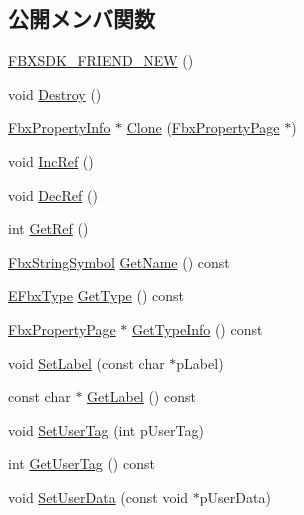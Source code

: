 \subsection*{公開メンバ関数}
\begin{DoxyCompactItemize}
\item 
\hyperlink{class_fbx_property_info_acec5442061367182cd674a7dd3267bc3}{F\+B\+X\+S\+D\+K\+\_\+\+F\+R\+I\+E\+N\+D\+\_\+\+N\+EW} ()
\item 
void \hyperlink{class_fbx_property_info_a8d507d411ed1695e545fbae824cf3843}{Destroy} ()
\item 
\hyperlink{class_fbx_property_info}{Fbx\+Property\+Info} $\ast$ \hyperlink{class_fbx_property_info_a2eacb232583e5bcb8f4abc5f6689b3b7}{Clone} (\hyperlink{class_fbx_property_page}{Fbx\+Property\+Page} $\ast$)
\item 
void \hyperlink{class_fbx_property_info_afa1a32d32b37e32e4b1ff4977b3ee9ab}{Inc\+Ref} ()
\item 
void \hyperlink{class_fbx_property_info_abea3d3ce25a205502657711eb7e2c6f2}{Dec\+Ref} ()
\item 
int \hyperlink{class_fbx_property_info_a1ca38d3986793f1a028a0bf84fe212c3}{Get\+Ref} ()
\item 
\hyperlink{class_fbx_string_symbol}{Fbx\+String\+Symbol} \hyperlink{class_fbx_property_info_af06f1b9f0f8505414e1cf85cc87cfb2a}{Get\+Name} () const
\item 
\hyperlink{fbxpropertytypes_8h_a73913a5ddfb20e57c6f25e9e6784bd92}{E\+Fbx\+Type} \hyperlink{class_fbx_property_info_adbe577ff5fe12e6f9a3a80b092e4c204}{Get\+Type} () const
\item 
\hyperlink{class_fbx_property_page}{Fbx\+Property\+Page} $\ast$ \hyperlink{class_fbx_property_info_adef9c91ef693e2c4eb6a918c086f4789}{Get\+Type\+Info} () const
\item 
void \hyperlink{class_fbx_property_info_a6de44806bb42999c71d742412410ae37}{Set\+Label} (const char $\ast$p\+Label)
\item 
const char $\ast$ \hyperlink{class_fbx_property_info_a94e6d246bc911d53eb56b855bff47055}{Get\+Label} () const
\item 
void \hyperlink{class_fbx_property_info_af602f7b028dd1d1c43f5181650ddda5e}{Set\+User\+Tag} (int p\+User\+Tag)
\item 
int \hyperlink{class_fbx_property_info_af756a4aefd06a0f57781a7c99cd8d133}{Get\+User\+Tag} () const
\item 
void \hyperlink{class_fbx_property_info_aab80f1b62d49a915018ea8aad93a2a77}{Set\+User\+Data} (const void $\ast$p\+User\+Data)

\end{DoxyCompactItemize}
